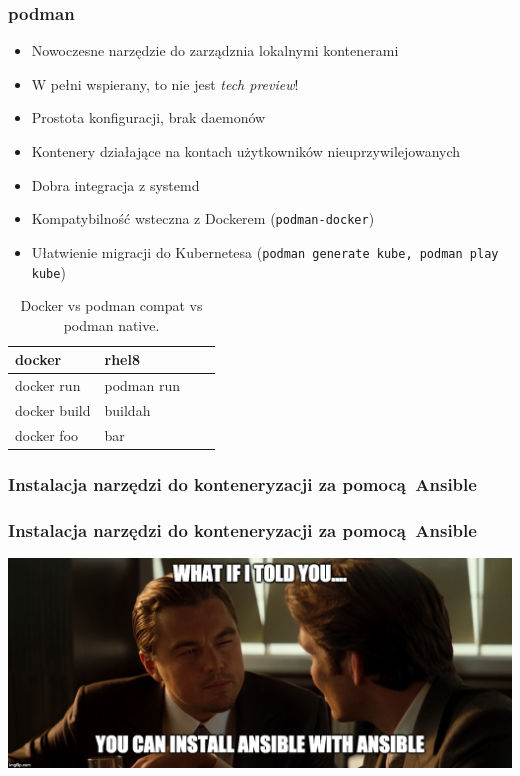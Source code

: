 \documentclass[dvipsnames,table]{beamer}
\begin{document}
\begin{frame}
	\frametitle{podman}
	\begin{itemize}
		\item Nowoczesne narzędzie do zarządznia lokalnymi kontenerami
		\item W pełni wspierany, to nie jest {\em tech preview}!
		\item Prostota konfiguracji, brak daemonów
		\item Kontenery działające na kontach użytkowników nieuprzywilejowanych
		\item Dobra integracja z systemd
		\item Kompatybilność wsteczna z Dockerem ({\tt podman-docker})
		\item Ułatwienie migracji do Kubernetesa ({\tt podman generate kube, podman play kube})
	\end{itemize}
\centering
	\begin{table}
\caption{Docker vs podman compat vs podman native.}
\label{porownanie}
\scriptsize
\begin{tabular}{llll}
\hline
docker & rhel8    \\ \hline
docker run & podman run \\
docker build & buildah  \\
docker foo & bar \\ \hline
\end{tabular}
\normalsize
\end{table}
\end{frame}

\begin{frame}[fragile]
	\frametitle{Instalacja narzędzi do konteneryzacji za pomocą Ansible}
	
\end{frame}

\begin{frame}[fragile]
	\frametitle{Instalacja narzędzi do konteneryzacji za pomocą Ansible}
\begin{center}
\includegraphics[scale=0.13]{img-ansibleinception.jpg}
\end{center}

\end{frame}
\end{document}
